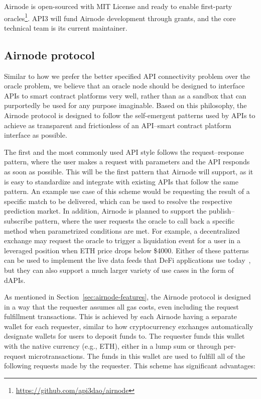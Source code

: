 \documentclass[11pt]{article}
\begin{document}
Airnode is open-sourced with MIT License and ready to enable first-party oracles\footnote{\url{https://github.com/api3dao/airnode}}.
API3 will fund Airnode development through grants, and the core technical team is its current maintainer.

\subsection{Airnode protocol}
\label{sec:airnode-protocol}

Similar to how we prefer the better specified API connectivity problem over the oracle problem, we believe that an oracle node should be designed to interface APIs to smart contract platforms very well, rather than as a sandbox that can purportedly be used for any purpose imaginable.
Based on this philosophy, the Airnode protocol is designed to follow the self-emergent patterns used by APIs to achieve as transparent and frictionless of an API--smart contract platform interface as possible.

The first and the most commonly used API style follows the request--response pattern, where the user makes a request with parameters and the API responds as soon as possible.
This will be the first pattern that Airnode will support, as it is easy to standardize and integrate with existing APIs that follow the same pattern.
An example use case of this scheme would be requesting the result of a specific match to be delivered, which can be used to resolve the respective prediction market.
In addition, Airnode is planned to support the publish--subscribe pattern, where the user requests the oracle to call back a specific method when parametrized conditions are met.
For example, a decentralized exchange may request the oracle to trigger a liquidation event for a user in a leveraged position when ETH price drops below \$4000.
Either of these patterns can be used to implement the live data feeds that DeFi applications use today~\cite{liu:2020}, but they can also support a much larger variety of use cases in the form of dAPIs.

As mentioned in Section~\ref{sec:airnode-features}, the Airnode protocol is designed in a way that the requester assumes all gas costs, even including the request fulfillment transactions.
This is achieved by each Airnode having a separate wallet for each requester, similar to how cryptocurrency exchanges automatically designate wallets for users to deposit funds to.
The requester funds this wallet with the native currency (e.g., ETH), either in a lump sum or through per-request microtransactions.
The funds in this wallet are used to fulfill all of the following requests made by the requester.
This scheme has significant advantages:
\end{document}
